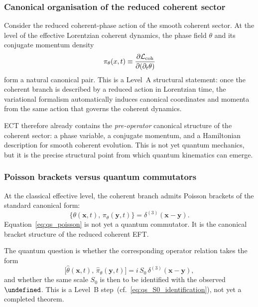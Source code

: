 \documentclass[11pt,a4paper]{article}
\let\hbar\undefined
\numberwithin{equation}{section}
\begin{document}
\subsubsection*{Canonical organisation of the reduced coherent sector}

Consider the reduced coherent-phase action of the smooth coherent sector.
At the level of the effective Lorentzian coherent dynamics, the phase
field $\theta$ and its conjugate momentum density
\begin{equation}
  \label{eq:qs_pi_theta}
  \pi_\theta(x,t)
  \equiv
  \frac{\partial \mathcal{L}_{\rm coh}}{\partial(\partial_t\theta)}
\end{equation}
form a natural canonical pair.
This is a Level~A structural statement: once the coherent branch is
described by a reduced action in Lorentzian time, the variational
formalism automatically induces canonical coordinates and momenta from
the same action that governs the coherent dynamics.

ECT therefore already contains the \emph{pre-operator} canonical
structure of the coherent sector: a phase variable, a conjugate
momentum, and a Hamiltonian description for smooth coherent evolution.
This is not yet quantum mechanics, but it is the precise structural
point from which quantum kinematics can emerge.

\subsubsection*{Poisson brackets versus quantum commutators}

At the classical effective level, the coherent branch admits Poisson
brackets of the standard canonical form:
\begin{equation}
  \label{eq:qs_poisson}
  \bigl\{\theta(\mathbf{x},t),\,\pi_\theta(\mathbf{y},t)\bigr\}
  =
  \delta^{(3)}(\mathbf{x}-\mathbf{y}).
\end{equation}
Equation~\eqref{eq:qs_poisson} is not yet a quantum commutator.
It is the canonical bracket structure of the reduced coherent EFT.

The quantum question is whether the corresponding operator relation
takes the form
\begin{equation}
  \label{eq:qs_commutator_candidate}
  \bigl[\hat\theta(\mathbf{x},t),\,\hat\pi_\theta(\mathbf{y},t)\bigr]
  =
  i\,S_0\,\delta^{(3)}(\mathbf{x}-\mathbf{y}),
\end{equation}
and whether the same scale $S_0$ is then to be identified with the
observed $\hbar$.
This is a Level~B step~(cf.~\eqref{eq:qs_S0_identification}),
not yet a completed theorem.
\end{document}
